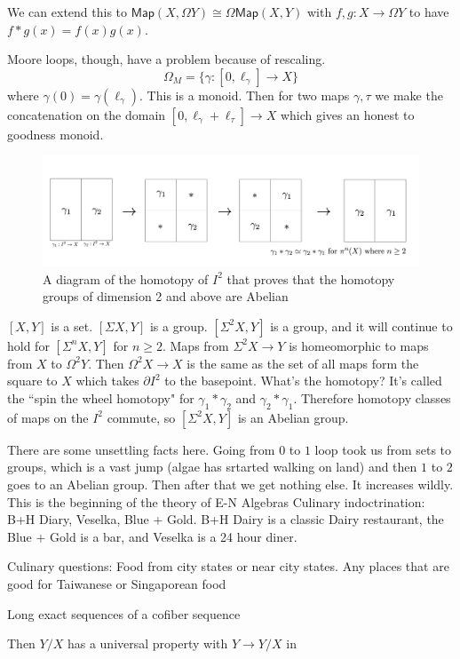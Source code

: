 \documentclass[10pt]{article}
\theoremstyle{definition}
\begin{document}
	
	We can extend this to $\mathsf{Map}(X,\Omega Y)\cong \Omega\mathsf{Map}(X,Y)$ with $f,g:X\to \Omega Y$ to have $f\ast g(x)=f(x)g(x)$. 
	
	Moore loops, though, have a problem because of rescaling.\[
	\Omega_M=\{\gamma:[0,\ell_\gamma]\to X\}
	\]
	where $\gamma(0)=\gamma(\ell_\gamma)$. This is a monoid. Then for two maps $\gamma, \tau$ we make the concatenation on the domain $[0,\ell_\gamma+\ell_\tau]\to X$ which gives an honest to goodness monoid. 
	\begin{figure}
		\includegraphics[width=\textwidth]{homotopygroupsabelian.png}
		\caption{A diagram of the homotopy of $I^2$ that proves that the homotopy groups of dimension 2 and above are Abelian}
	\end{figure}
	
	$[X,Y]$ is a set. $[\Sigma X, Y]$ is a group. $[\Sigma^2 X, Y]$ is a group, and it will continue to hold for $[\Sigma^n X, Y]$ for $n\geq 2$. Maps from $\Sigma^2 X\to Y$ is homeomorphic to maps from $X$ to $\Omega^2 Y$. Then $\Omega^2 X \to X$ is the same as the set of all maps form the square to $X$ which takes $\partial I^2$ to the basepoint. What's the homotopy? It's called the ``spin the wheel homotopy" for $\gamma_1\ast \gamma_2$ and $\gamma_2\ast \gamma_1$. Therefore homotopy classes of maps on the $I^2$ commute, so $[\Sigma^2 X, Y]$ is an Abelian group. 
	
	There are some unsettling facts here. Going from $0$ to $1$ loop took us from sets to groups, which is a vast jump (algae has srtarted walking on land) and then $1$ to $2$ goes to an Abelian group. Then after that we get nothing else. It increases wildly. This is the beginning of the theory of E-N Algebras
		Culinary indoctrination:
	B+H Diary, Veselka, Blue + Gold. B+H Dairy is a classic Dairy restaurant, the Blue + Gold is a bar, and Veselka is a 24 hour diner.
	
	Culinary questions: Food from city states or near city states. Any places that are good for Taiwanese or Singaporean food
	
	Long exact sequences of a cofiber sequence \begin{center}
	\end{center}
	Then $Y/X$ has a universal property with $Y\to Y/X$ in \begin{center}
	\end{center}
	
\end{document}
